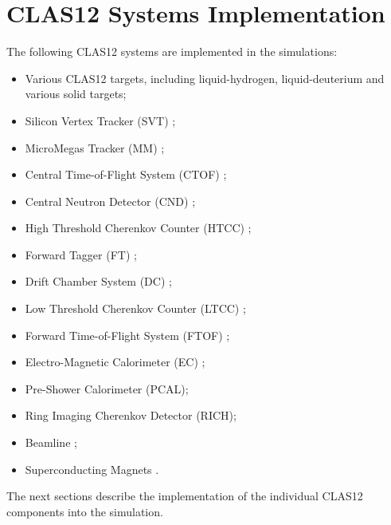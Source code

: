 \section{CLAS12 Systems Implementation}

The following CLAS12 systems are implemented in the simulations:

\begin{itemize}
\item Various CLAS12 targets, including liquid-hydrogen, liquid-deuterium and various solid targets;
\item Silicon Vertex Tracker (SVT) \cite{svt-nim};
\item MicroMegas Tracker (MM) \cite{mm-nim};
\item Central Time-of-Flight System (CTOF) \cite{ctof-nim};
\item Central Neutron Detector (CND) \cite{cnd-nim};
\item High Threshold Cherenkov Counter (HTCC) \cite{htcc-nim};
\item Forward Tagger (FT) \cite{ft-nim};
\item Drift Chamber System (DC) \cite{dc-nim};
\item Low Threshold Cherenkov Counter (LTCC) \cite{ltcc-nim};
\item Forward Time-of-Flight System (FTOF) \cite{ftof-nim};
\item Electro-Magnetic Calorimeter (EC) \cite{Amarian:2001zs};
\item Pre-Shower Calorimeter (PCAL)\cite{ec-nim};
\item Ring Imaging Cherenkov Detector (RICH)\cite{rich-nim};
\item Beamline \cite{beamline-nim};
\item Superconducting Magnets \cite{magnets-nim}.
\end{itemize}


The next sections describe the implementation of the individual CLAS12 components into the simulation.
